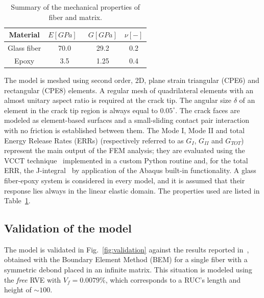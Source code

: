\documentclass[review]{elsarticle}
\begin{document}
\begin{table}[!htbp]
 \centering
 \caption{Summary of the mechanical properties of fiber and matrix.}
 \begin{tabular}{cccc}
\textbf{Material} & \textbf{$E\left[GPa\right]$}\ & \textbf{$G\left[GPa\right]$} & \textbf{$\nu\left[-\right]$} \\
\midrule
Glass fiber    & 70.0  & 29.2   & 0.2  \\
Epoxy    & 3.5    & 1.25   & 0.4
\end{tabular}
\label{tab:phaseprop}
\end{table}

The model is meshed using second order, 2D, plane strain triangular (CPE6) and rectangular (CPE8) elements. A regular mesh of quadrilateral elements with an almost unitary aspect ratio is required at the crack tip. The angular size $\delta$ of an element in the crack tip region is always equal to $0.05^{\circ}$. The crack faces are modeled as element-based surfaces and a small-sliding contact pair interaction with no friction is established between them. The Mode I, Mode II and total Energy Release Rates (ERRs) (respectively referred to as $G_{I}$, $G_{II}$ and $G_{TOT}$) represent the main output of the FEM analysis; they are evaluated using the VCCT technique~\cite{Krueger2004} implemented in a custom Python routine and, for the total ERR, the J-integral~\cite{Rice1968} by application of the Abaqus built-in functionality. A glass fiber-epoxy system is considered in every model, and it is assumed that their response lies always in the linear elastic domain. The properties used are listed in Table~\ref{tab:phaseprop}.

\subsection{Validation of the model}

The model is validated in Fig.~\ref{fig:validation} against the results reported in~\cite{Paris2007,Sandino2016}, obtained with the Boundary Element Method (BEM) for a single fiber with a symmetric debond placed in an infinite matrix. This situation is modeled using the \textit{free} RVE with $V_{f}=0.0079\%$, which corresponds to a RUC's length and height of $\sim 100$.
\end{document}
